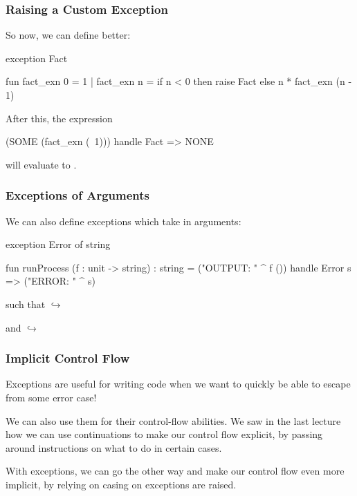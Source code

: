 \documentclass[aspectratio=169]{beamer}
\begin{document}
\begin{frame}[fragile]
  \frametitle{Raising a Custom Exception}

  So now, we can define  better: 
  \begin{codeblock}
    exception Fact 

    fun fact_exn 0 = 1
      | fact_exn n = 
          if n < 0 then 
            raise Fact
          else
            n * fact_exn (n - 1)
  \end{codeblock}

  After this, the expression
  \begin{codeblock}
    (SOME (fact_exn (~1))) handle Fact => NONE
  \end{codeblock}
  will evaluate to .
\end{frame}

\begin{frame}[fragile]
  \frametitle{Exceptions of Arguments}

  We can also define exceptions which take in arguments:
  \begin{codeblock}
    exception Error of string

    fun runProcess (f : unit -> string) : string =
      ("OUTPUT: " ^ f ()) handle Error s => ("ERROR: " ^ s)  
  \end{codeblock}

  such that
   $\hookrightarrow$ 

  and 
   $\hookrightarrow$ 
\end{frame}


\begin{frame}[fragile]
  \frametitle{Implicit Control Flow}

  Exceptions are useful for writing code when we want to quickly be able to escape
  from some error case!

  \vspace{\fill}

  We can also use them for their control-flow abilities. We saw in the last lecture
  how we can use continuations to make our control flow explicit, by passing
  around instructions on what to do in certain cases.

  \vspace{\fill}

  With exceptions, we can go the other way and make our control flow even more implicit,
  by relying on casing on exceptions are raised. 
\end{frame}
\end{document}

